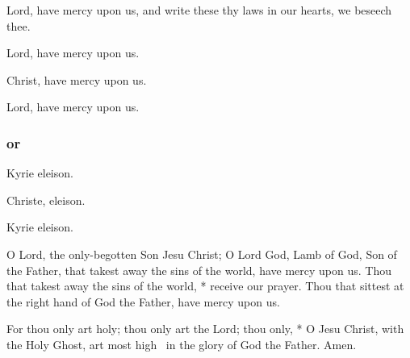 \R Lord, have mercy upon us, and write these thy laws in our hearts, we beseech thee.



\medskip


\smallskip

\centerline{Lord, have mercy upon us. }
\centerline{Christ, have mercy upon us. }
\centerline{Lord, have mercy upon us. }
\subsubsection{or}

\centerline{Kyrie eleison. }
\centerline{Christe, eleison. }
\centerline{Kyrie eleison. }

\bigskip



O Lord, the only-begotten Son Jesu Christ; O Lord God, Lamb of God, Son of the Father, that takest away the sins of the world, have mercy upon us. 
Thou that takest away the sins of the world, * receive our prayer. Thou that sittest at the right hand of God the Father, have mercy upon us.

For thou only art holy; thou only art the Lord; thou only, * O {Jesu} Christ, with the Holy Ghost, art most high \grecross\ in the glory of God the Father. Amen.

{\footnotesize{}\par}

